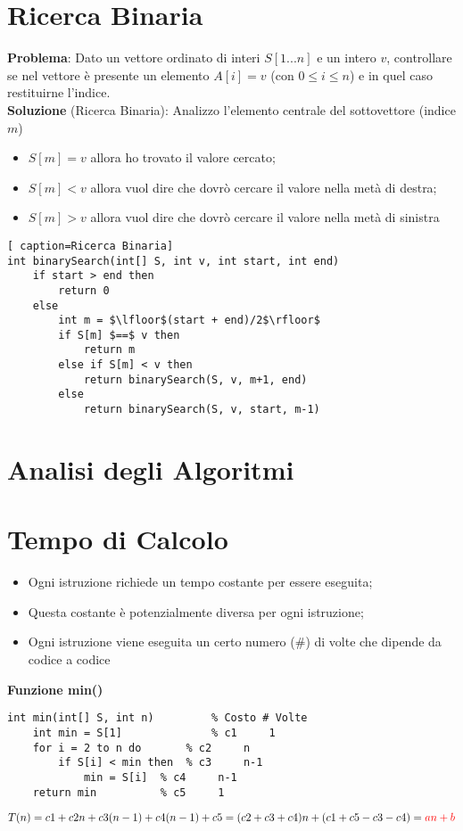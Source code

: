 \documentclass[../cheatSheetAlgoritmi.tex]{subfiles}
\begin{document}
\section{Ricerca Binaria}
\textbf{Problema}: Dato un vettore ordinato di interi $S[1...n]$ e un intero $v$, controllare se nel vettore è presente un elemento $A[i] = v$ (con $0 \leq i \leq n$) e in quel caso restituirne l'indice.\\
\textbf{Soluzione} (Ricerca Binaria): Analizzo l'elemento centrale del sottovettore (indice $m$)
\begin{itemize}
	\item $S[m]=v$ allora ho trovato il valore cercato;
	\item $S[m]<v$ allora vuol dire che dovrò cercare il valore nella metà di destra;
	\item $S[m]>v$ allora vuol dire che dovrò cercare il valore nella metà di sinistra
\end{itemize}
\begin{lstlisting}[ caption=Ricerca Binaria]
int binarySearch(int[] S, int v, int start, int end)
	if start > end then
		return 0
	else
		int m = $\lfloor$(start + end)/2$\rfloor$
		if S[m] $==$ v then
			return m
		else if S[m] < v then
			return binarySearch(S, v, m+1, end)
		else
			return binarySearch(S, v, start, m-1)
\end{lstlisting}

\section{Analisi degli Algoritmi}
\section{Tempo di Calcolo}
\begin{itemize}
	\item Ogni istruzione richiede un tempo costante per essere eseguita;
	\item Questa costante è potenzialmente diversa per ogni istruzione;
	\item Ogni istruzione viene eseguita un certo numero (\#) di volte che dipende da codice a codice
\end{itemize}
\textbf{Funzione min()}
\begin{lstlisting}[caption=Ricerca Minimo + calcolo del costo]
int min(int[] S, int n)			% Costo # Volte
	int min = S[1]	    		% c1   	 1
	for i = 2 to n do		% c2     n
		if S[i] < min then 	% c3 	 n-1
			min = S[i]	% c4 	 n-1
	return min			% c5	 1
\end{lstlisting}
$T(n) = c1 + c2n + c3(n-1) + c4(n-1) + c5 = (c2 + c3 + c4)n + (c1 + c5 - c3 - c4) = \textcolor{red}{an + b}$
\end{document}
